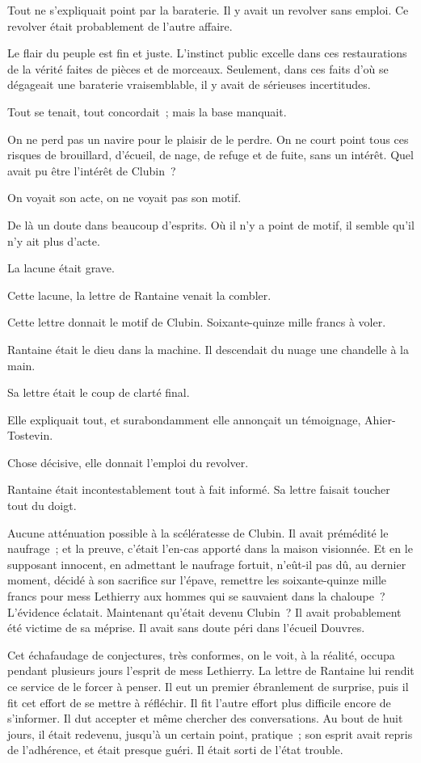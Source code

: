 \documentclass[french,twoside]{book} %
\begin{document}
Tout ne s’expliquait point par la baraterie. Il y avait un revolver sans emploi. Ce revolver était probablement de l’autre affaire.\par
Le flair du peuple est fin et juste. L’instinct public excelle dans ces restaurations de la vérité faites de pièces et de morceaux. Seulement, dans ces faits d’où se dégageait une baraterie vraisemblable, il y avait de sérieuses incertitudes.\par
Tout se tenait, tout concordait ; mais la base manquait.\par
On ne perd pas un navire pour le plaisir de le perdre. On ne court point tous ces risques de brouillard, d’écueil, de nage, de refuge et de fuite, sans un intérêt. Quel avait pu être l’intérêt de Clubin ?\par
On voyait son acte, on ne voyait pas son motif.\par
De là un doute dans beaucoup d’esprits. Où il n’y a point de motif, il semble qu’il n’y ait plus d’acte.\par
La lacune était grave.\par
 Cette lacune, la lettre de Rantaine venait la combler.\par
Cette lettre donnait le motif de Clubin. Soixante-quinze mille francs à voler.\par
Rantaine était le dieu dans la machine. Il descendait du nuage une chandelle à la main.\par
Sa lettre était le coup de clarté final.\par
Elle expliquait tout, et surabondamment elle annonçait un témoignage, Ahier-Tostevin.\par
Chose décisive, elle donnait l’emploi du revolver.\par
Rantaine était incontestablement tout à fait informé. Sa lettre faisait toucher tout du doigt.\par
Aucune atténuation possible à la scélératesse de Clubin. Il avait prémédité le naufrage ; et la preuve, c’était l’en-cas apporté dans la maison visionnée. Et en le supposant innocent, en admettant le naufrage fortuit, n’eût-il pas dû, au dernier moment, décidé à son sacrifice sur l’épave, remettre les soixante-quinze mille francs pour mess Lethierry aux hommes qui se sauvaient dans la chaloupe ? L’évidence éclatait. Maintenant qu’était devenu Clubin ? Il avait probablement été victime de sa méprise. Il avait sans doute péri dans l’écueil Douvres.\par
Cet échafaudage de conjectures, très conformes, on le voit, à la réalité, occupa pendant plusieurs jours l’esprit de mess Lethierry. La lettre de Rantaine lui rendit ce service de le forcer à penser. Il eut un premier ébranlement de surprise, puis il fit cet effort de se mettre à réfléchir. Il fit l’autre effort plus difficile encore de s’informer. Il dut accepter et même chercher  des conversations. Au bout de huit jours, il était redevenu, jusqu’à un certain point, pratique ; son esprit avait repris de l’adhérence, et était presque guéri. Il était sorti de l’état trouble.\par
\end{document}
